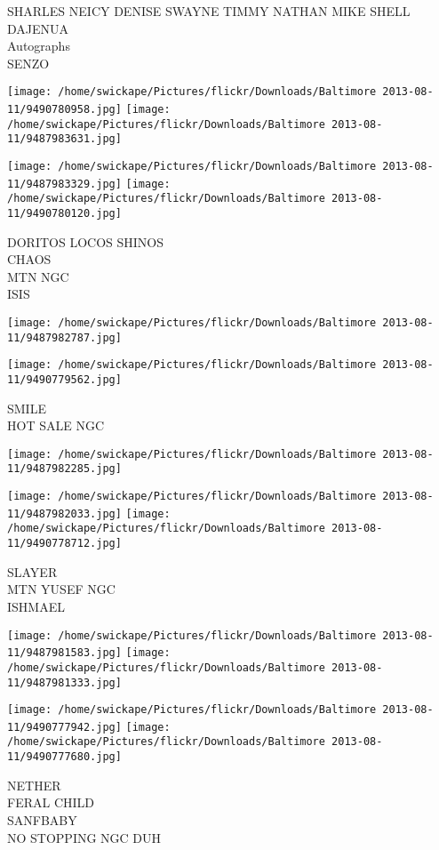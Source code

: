 \documentclass[10pt,letterpaper]{article}
\begin{document}
SHARLES NEICY DENISE SWAYNE TIMMY NATHAN MIKE SHELL DAJENUA\\
Autographs\\
SENZO
\pagebreak

\texttt{[image: /home/swickape/Pictures/flickr/Downloads/Baltimore 2013-08-11/9490780958.jpg]}
\texttt{[image: /home/swickape/Pictures/flickr/Downloads/Baltimore 2013-08-11/9487983631.jpg]}

\texttt{[image: /home/swickape/Pictures/flickr/Downloads/Baltimore 2013-08-11/9487983329.jpg]}
\texttt{[image: /home/swickape/Pictures/flickr/Downloads/Baltimore 2013-08-11/9490780120.jpg]}

DORITOS LOCOS SHINOS\\
CHAOS\\
MTN NGC\\
ISIS
\pagebreak

\texttt{[image: /home/swickape/Pictures/flickr/Downloads/Baltimore 2013-08-11/9487982787.jpg]}

\vspace{0.25in}
\texttt{[image: /home/swickape/Pictures/flickr/Downloads/Baltimore 2013-08-11/9490779562.jpg]}

SMILE\\
HOT SALE NGC
\pagebreak

\texttt{[image: /home/swickape/Pictures/flickr/Downloads/Baltimore 2013-08-11/9487982285.jpg]}

\vspace{0.25in}
\texttt{[image: /home/swickape/Pictures/flickr/Downloads/Baltimore 2013-08-11/9487982033.jpg]}
\texttt{[image: /home/swickape/Pictures/flickr/Downloads/Baltimore 2013-08-11/9490778712.jpg]}

SLAYER\\
MTN YUSEF NGC\\
ISHMAEL
\pagebreak

\texttt{[image: /home/swickape/Pictures/flickr/Downloads/Baltimore 2013-08-11/9487981583.jpg]}
\texttt{[image: /home/swickape/Pictures/flickr/Downloads/Baltimore 2013-08-11/9487981333.jpg]}

\texttt{[image: /home/swickape/Pictures/flickr/Downloads/Baltimore 2013-08-11/9490777942.jpg]}
\texttt{[image: /home/swickape/Pictures/flickr/Downloads/Baltimore 2013-08-11/9490777680.jpg]}

NETHER\\
FERAL CHILD\\
SANFBABY\\
NO STOPPING NGC DUH
\pagebreak
\end{document}
